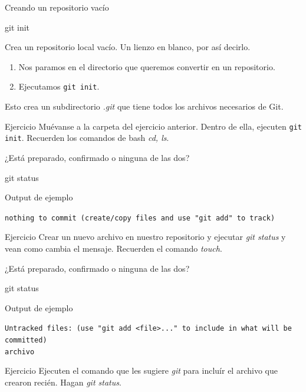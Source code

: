 \begin{frame}[t]{Creando un repositorio vacío}
    \begin{comando}
        git init
    \end{comando}

    \pause
    \begin{block}{}
        Crea un repositorio local vacío. Un lienzo en blanco, por así decirlo.
        \begin{enumerate}
            \item Nos paramos en el directorio que queremos convertir en un repositorio.
            \item Ejecutamos \texttt{git init}.
        \end{enumerate}
        Esto crea un subdirectorio \textit{.git} que tiene todos los archivos necesarios de Git.
    \end{block}
    \pause
    \begin{ejercicio}{Ejercicio}
        Muévanse a la carpeta del ejercicio anterior. Dentro de ella, ejecuten \texttt{git init}. Recuerden los comandos de bash \textit{cd, ls}.
    \end{ejercicio}
\end{frame}
\begin{frame}[fragile, t]{¿Está preparado, confirmado o ninguna de las dos?}
    \begin{comando}
        git status
    \end{comando}
        \begin{block}{Output de ejemplo}
            \begin{center}
            \texttt{nothing to commit (create/copy files and use "git add" to track)}
            \end{center}
        \end{block}
    \pause
    \begin{ejercicio}{Ejercicio}
        Crear un nuevo archivo en nuestro repositorio y ejecutar \textit{git status} y vean como cambia el mensaje. Recuerden el comando \textit{touch}.
    \end{ejercicio}

\end{frame}

\begin{frame}[fragile, t]{¿Está preparado, confirmado o ninguna de las dos?}
    \begin{comando}
        git status
    \end{comando}
    \begin{block}{Output de ejemplo}
            \begin{center}
            \texttt{Untracked files:
  (use "git add <file>..." to include in what will be committed) \\archivo}
            \end{center}
        \end{block}
\begin{ejercicio}{Ejercicio}
    Ejecuten el comando que les sugiere \textit{git} para incluír el archivo que crearon recién. Hagan \textit{git status}.
\end{ejercicio}
\end{frame}

